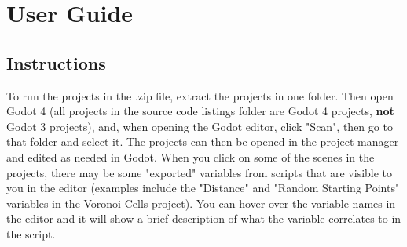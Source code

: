 \chapter{User Guide} \label{Guide}
\section{Instructions}

To run the projects in the .zip file, extract the projects in one folder. Then open Godot 4 (all projects in the source code listings folder are Godot 4 projects, \textbf{not} Godot 3 projects), and, when opening the Godot editor, click "Scan", then go to that folder and select it. The projects can then be opened in the project manager and edited as needed in Godot. When you click on some of the scenes in the projects, there may be some "exported" variables from scripts that are visible to you in the editor (examples include the "Distance" and "Random Starting Points" variables in the Voronoi Cells project). You can hover over the variable names in the editor and it will show a brief description of what the variable correlates to in the script.


